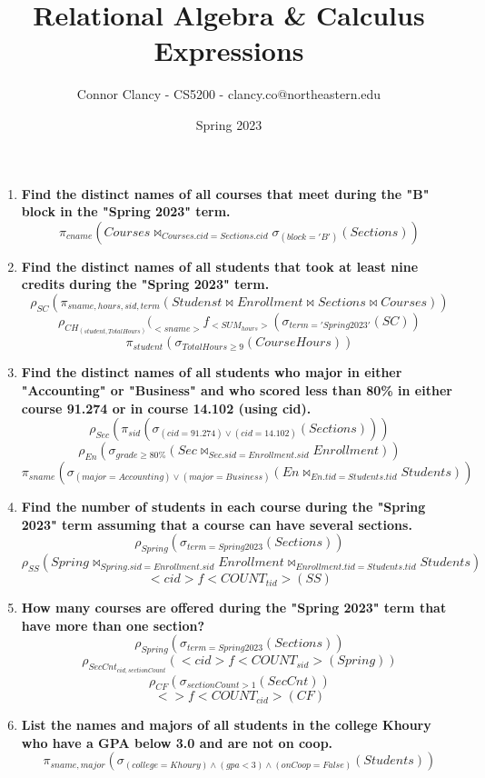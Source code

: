 \documentclass{article}
\title{Relational Algebra \& Calculus Expressions}
\author{Connor Clancy - CS5200 - clancy.co@northeastern.edu}
\date{Spring 2023}
\begin{document}
\maketitle

\begin{enumerate}
    \item \textbf{Find the distinct names of all courses that meet during the "B" block in the "Spring 2023" term.} \[\pi_{cname}(Courses \bowtie_{Courses.cid = Sections.cid} \sigma_{(block = 'B')}(Sections))\]

    \item \textbf{Find the distinct names of all students that took at least nine credits during the "Spring 2023" term.} 
    \[\rho_{SC}(\pi_{sname, hours, sid, term}(Studenst \bowtie Enrollment \bowtie Sections 
    \bowtie Courses))\]
    \[\rho_{CH_{(student, TotalHours)}}(_{<sname>} f _{<SUM_{hours}>} (\sigma_{term='Spring 2023'}(SC))\]
    \[\pi_{student} (\sigma_{TotalHours \ge 9}(CourseHours))\]

    \item \textbf{Find the distinct names of all students who major in either "Accounting" or "Business" and who scored less than 80\% in either course 91.274 or in course 14.102 (using cid).}
    \[\rho_{Sec}(\pi_{sid}(\sigma_{(cid = 91.274) \lor (cid =14.102)}(Sections)))\]
    \[\rho_{En}(\sigma_{grade \ge 80\%}(Sec \bowtie_{Sec.sid = Enrollment.sid} Enrollment))\]
    \[\pi_{sname}(\sigma_{(major = Accounting) \lor (major = Business)}(En 
    \bowtie_{En.tid=Students.tid} Students))\]

    \item\textbf{Find the number of students in each course during the "Spring 2023" term assuming that a course can have several sections.}
    \[\rho_{Spring}(\sigma_{term = Spring 2023}(Sections))\]
    \[\rho_{SS}(Spring \bowtie_{Spring.sid=Enrollment.sid} Enrollment 
    \bowtie_{Enrollment.tid=Students.tid} Students)\]
    \[<cid> f <COUNT_{tid}>(SS)\]

    \item \textbf{How many courses are offered during the "Spring 2023" term that have more than one section?}
     \[\rho_{Spring}(\sigma_{term = Spring 2023}(Sections))\]
     \[\rho_{SecCnt_{cid, sectionCount}}(<cid> f <COUNT_{sid}>(Spring))\]
     \[\rho_{CF}(\sigma_{sectionCount > 1}(SecCnt))\]
     \[<> f <COUNT_{cid}>(CF)\]

     \item \textbf{List the names and majors of all students in the college Khoury who have a GPA below 3.0 and are not on coop.}
     \[\pi_{sname, major}(\sigma_{(college=Khoury) \land (gpa<3) \land (onCoop=False)}(Students))\]


\end{enumerate}
\end{document}
